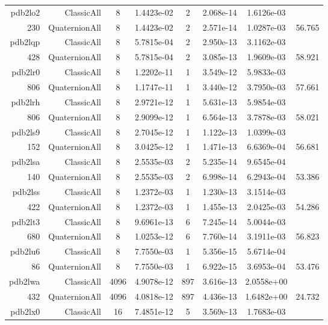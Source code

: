 \begin{xltabular}{\textwidth}{r|rcS[table-format=1.4e+2]cS[table-format=1.3e+2]S[table-format=1.4e+2]S[table-format=-1.3]}
pdb2lo2 & ClassicAll & 8 & 1.4423e-02 & 2 & 2.068e-14 & 1.6126e-03 & \\
230 & QuaternionAll & 8 & 1.4423e-02 & 2 & 2.571e-14 & 1.0287e-03 & 56.765\\  \addlinespace
pdb2lqp & ClassicAll & 8 & 5.7815e-04 & 2 & 2.950e-13 & 3.1162e-03 & \\
428 & QuaternionAll & 8 & 5.7815e-04 & 2 & 3.085e-13 & 1.9609e-03 & 58.921\\  \addlinespace
pdb2lr0 & ClassicAll & 8 & 1.2202e-11 & 1 & 3.549e-12 & 5.9833e-03 & \\
806 & QuaternionAll & 8 & 1.1747e-11 & 1 & 3.440e-12 & 3.7950e-03 & 57.661\\  \addlinespace
pdb2lrh & ClassicAll & 8 & 2.9721e-12 & 1 & 5.631e-13 & 5.9854e-03 & \\
806 & QuaternionAll & 8 & 2.9099e-12 & 1 & 6.564e-13 & 3.7878e-03 & 58.021\\  \addlinespace
pdb2ls9 & ClassicAll & 8 & 2.7045e-12 & 1 & 1.122e-13 & 1.0399e-03 & \\
152 & QuaternionAll & 8 & 3.0425e-12 & 1 & 1.471e-13 & 6.6369e-04 & 56.681\\  \addlinespace
pdb2lsa & ClassicAll & 8 & 2.5535e-03 & 2 & 5.235e-14 & 9.6545e-04 & \\
140 & QuaternionAll & 8 & 2.5535e-03 & 2 & 6.998e-14 & 6.2943e-04 & 53.386\\  \addlinespace
pdb2lss & ClassicAll & 8 & 1.2372e-03 & 1 & 1.230e-13 & 3.1514e-03 & \\
422 & QuaternionAll & 8 & 1.2372e-03 & 1 & 1.455e-13 & 2.0425e-03 & 54.286\\  \addlinespace
pdb2lt3 & ClassicAll & 8 & 9.6961e-13 & 6 & 7.245e-14 & 5.0044e-03 & \\
680 & QuaternionAll & 8 & 1.0253e-12 & 6 & 7.760e-14 & 3.1911e-03 & 56.823\\  \addlinespace
pdb2lu6 & ClassicAll & 8 & 7.7550e-03 & 1 & 5.356e-15 & 5.6714e-04 & \\
86 & QuaternionAll & 8 & 7.7550e-03 & 1 & 6.922e-15 & 3.6953e-04 & 53.476\\  \addlinespace
pdb2lwa & ClassicAll & 4096 & 4.9078e-12 & 897 & 3.616e-13 & 2.0558e+00 & \\
432 & QuaternionAll & 4096 & 4.0818e-12 & 897 & 4.436e-13 & 1.6482e+00 & 24.732\\  \addlinespace
pdb2lx0 & ClassicAll & 16 & 7.4851e-12 & 5 & 3.569e-13 & 1.7683e-03 & \\

\end{xltabular}
